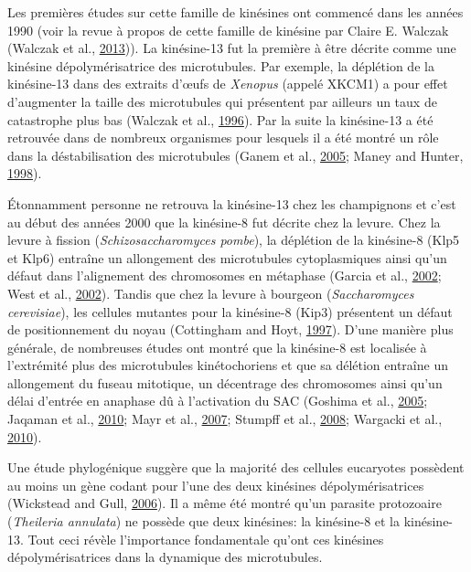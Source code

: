 \documentclass[12pt,a4paper,twoside,openright]{book}
\begin{document}
Les premières études sur cette famille de kinésines ont commencé dans
les années 1990 (voir la revue à propos de cette famille de kinésine par
Claire E. Walczak (Walczak et al., \hyperref[ref-Walczak2013a]{2013})).
La kinésine-13 fut la première à être décrite comme une kinésine
dépolymérisatrice des microtubules. Par exemple, la déplétion de la
kinésine-13 dans des extraits d'œufs de \emph{Xenopus} (appelé XKCM1) a
pour effet d'augmenter la taille des microtubules qui présentent par
ailleurs un taux de catastrophe plus bas (Walczak et al.,
\hyperref[ref-Walczak1996]{1996}). Par la suite la kinésine-13 a été
retrouvée dans de nombreux organismes pour lesquels il a été montré un
rôle dans la déstabilisation des microtubules (Ganem et al.,
\hyperref[ref-Ganem2005]{2005}; Maney and Hunter,
\hyperref[ref-Maney1998]{1998}).

Étonnamment personne ne retrouva la kinésine-13 chez les champignons et
c'est au début des années 2000 que la kinésine-8 fut décrite chez la
levure. Chez la levure à fission (\emph{Schizosaccharomyces pombe}), la
déplétion de la kinésine-8 (Klp5 et Klp6) entraîne un allongement des
microtubules cytoplasmiques ainsi qu'un défaut dans l'alignement des
chromosomes en métaphase (Garcia et al.,
\hyperref[ref-Garcia2002d]{2002}; West et al.,
\hyperref[ref-West2002]{2002}). Tandis que chez la levure à bourgeon
(\emph{Saccharomyces cerevisiae}), les cellules mutantes pour la
kinésine-8 (Kip3) présentent un défaut de positionnement du noyau
(Cottingham and Hoyt, \hyperref[ref-Cottingham1997]{1997}). D'une
manière plus générale, de nombreuses études ont montré que la kinésine-8
est localisée à l'extrémité plus des microtubules kinétochoriens et que
sa délétion entraîne un allongement du fuseau mitotique, un décentrage
des chromosomes ainsi qu'un délai d'entrée en anaphase dû à l'activation
du SAC (Goshima et al., \hyperref[ref-Goshima2005]{2005}; Jaqaman et
al., \hyperref[ref-Jaqaman2010]{2010}; Mayr et al.,
\hyperref[ref-Mayr2007]{2007}; Stumpff et al.,
\hyperref[ref-Stumpff2008]{2008}; Wargacki et al.,
\hyperref[ref-Wargacki2010]{2010}).

Une étude phylogénique suggère que la majorité des cellules eucaryotes
possèdent au moins un gène codant pour l'une des deux kinésines
dépolymérisatrices (Wickstead and Gull,
\hyperref[ref-Wickstead2006]{2006}). Il a même été montré qu'un parasite
protozoaire (\emph{Theileria annulata}) ne possède que deux kinésines:
la kinésine-8 et la kinésine-13. Tout ceci révèle l'importance
fondamentale qu'ont ces kinésines dépolymérisatrices dans la dynamique
des microtubules.
\end{document}
